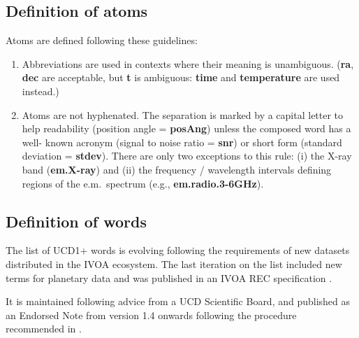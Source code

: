 \documentclass[11pt,a4paper]{ivoa}
\begin{document}
\subsection{Definition of atoms}
Atoms are defined following these guidelines:
\begin{enumerate}
\item Abbreviations are used in contexts where their meaning is unambiguous. ({\bf ra}, {\bf dec} are 
acceptable, but {\bf t} is ambiguous: {\bf time} and {\bf temperature} are used instead.)
\item Atoms are not hyphenated. The separation is marked by a capital letter to help readability 
(position angle = {\bf posAng}) unless the composed word has a well- known acronym (signal to noise ratio = 
{\bf snr}) or short form (standard deviation = {\bf stdev}). There are only two exceptions to this rule: 
(i) the X-ray band ({\bf em.X-ray}) and (ii) the frequency / wavelength intervals defining regions of the 
e.m.~spectrum (e.g., {\bf em.radio.3-6GHz}).
\end{enumerate}

\subsection{Definition of words}
\label{sec:words}

The list of UCD1+ words is evolving following the requirements of new datasets distributed in the 
IVOA ecosystem. The last iteration on the list included new terms for planetary data and was 
published in an IVOA REC specification \citep{2018ivoa.spec.0527PM}.

It is maintained following advice from a UCD Scientific Board, and published as an Endorsed Note 
from version 1.4 onwards following the procedure recommended in \citep{2019ivoa.spec.1007G}. 
\end{document}
